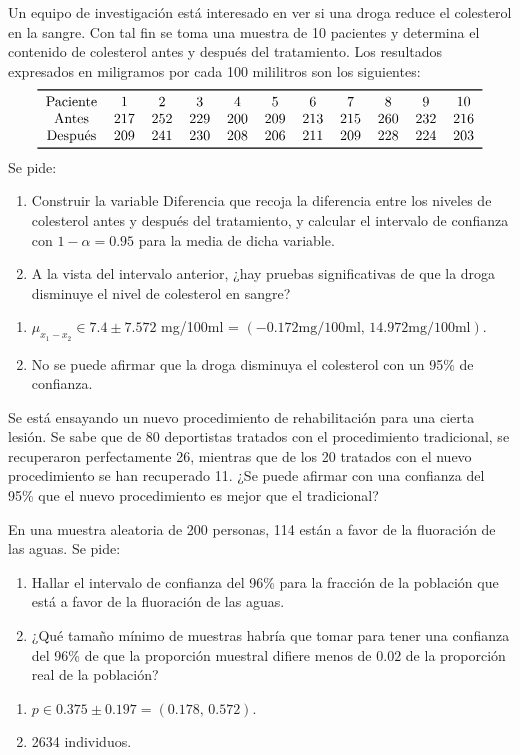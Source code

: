 {Un equipo de investigación está interesado en ver si una droga reduce el colesterol en la sangre.
Con tal fin se toma una muestra de 10 pacientes y determina el contenido de colesterol antes y después del tratamiento.
Los resultados expresados en miligramos por cada 100 mililitros son los siguientes:
\[
\begin{tabular}{ccccccccccc}
\toprule
Paciente & 1 & 2 & 3 & 4 & 5 & 6 & 7 & 8 & 9 & 10 \\
Antes & 217 & 252 & 229 & 200 & 209 & 213 & 215 & 260 & 232 & 216 \\ 
Después & 209 & 241 & 230 & 208 & 206 & 211 & 209 & 228 & 224 & 203 \\
\bottomrule
\end{tabular}
\]
Se pide:

\begin{enumerate}
\item Construir la variable Diferencia que recoja la diferencia entre los niveles de colesterol antes y después del
tratamiento, y calcular el intervalo de confianza con $1-\alpha =0.95$ para la media de dicha variable.
\item A la vista del intervalo anterior, ¿hay pruebas significativas de que la droga disminuye el nivel de colesterol
en sangre?
\end{enumerate}
}
{
\begin{enumerate}
\item $\mu_{x_1-x_2}\in 7.4\pm 7.572$ mg/100ml = $(-0.172\text{mg/100ml},\,14.972\text{mg/100ml})$.
\item No se puede afirmar que la droga disminuya el colesterol con un 95\% de confianza.
\end{enumerate}
}
{}


{Se está ensayando un nuevo procedimiento de rehabilitación para una cierta lesión.
Se sabe que de 80 deportistas tratados con el procedimiento tradicional, se recuperaron perfectamente 26, mientras que
de los 20 tratados con el nuevo procedimiento se han recuperado 11.
¿Se puede afirmar con una confianza del 95\% que el nuevo procedimiento es mejor que el tradicional?
}
{}
{}


{En una muestra aleatoria de 200 personas, 114 están a favor de la fluoración de las aguas.
Se pide:
\begin{enumerate}
\item Hallar el intervalo de confianza del 96\% para la fracción de la población que está a favor de la fluoración de
las aguas.
\item ¿Qué tamaño mínimo de muestras habría que tomar para tener una confianza del 96\% de que la proporción muestral
difiere menos de $0.02$ de la proporción real de la población?
\end{enumerate}
}
{
\begin{enumerate}
\item $p\in 0.375\pm 0.197 = (0.178,\,0.572)$.
\item 2634 individuos.
\end{enumerate}
}
{}


